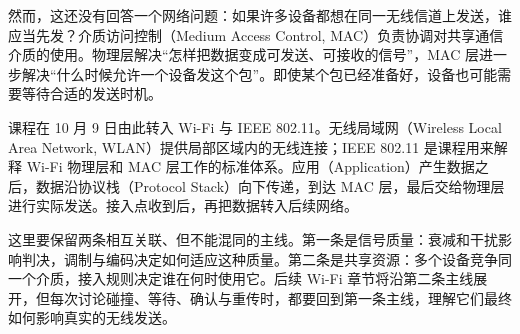 然而，这还没有回答一个网络问题：如果许多设备都想在同一无线信道上发送，谁应当先发？介质访问控制（Medium Access Control, MAC）负责协调对共享通信介质的使用。物理层解决“怎样把数据变成可发送、可接收的信号”，MAC 层进一步解决“什么时候允许一个设备发这个包”。即使某个包已经准备好，设备也可能需要等待合适的发送时机。

课程在 10 月 9 日由此转入 Wi-Fi 与 IEEE 802.11。无线局域网（Wireless Local Area Network, WLAN）提供局部区域内的无线连接；IEEE 802.11 是课程用来解释 Wi-Fi 物理层和 MAC 层工作的标准体系。应用（Application）产生数据之后，数据沿协议栈（Protocol Stack）向下传递，到达 MAC 层，最后交给物理层进行实际发送。接入点收到后，再把数据转入后续网络。

这里要保留两条相互关联、但不能混同的主线。第一条是信号质量：衰减和干扰影响判决，调制与编码决定如何适应这种质量。第二条是共享资源：多个设备竞争同一个介质，接入规则决定谁在何时使用它。后续 Wi-Fi 章节将沿第二条主线展开，但每次讨论碰撞、等待、确认与重传时，都要回到第一条主线，理解它们最终如何影响真实的无线发送。
